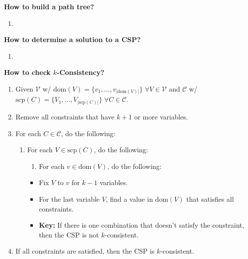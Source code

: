 \begin{example}
\end{example}

\begin{process} \textbf{How to build a path tree?}
    \begin{enumerate}
        \item 
    \end{enumerate}
\end{process}

\begin{example}
\end{example}

\begin{process} \textbf{How to determine a solution to a CSP?}
    \begin{enumerate}
        \item 
    \end{enumerate}
\end{process}

\begin{example}
\end{example}
\newpage

\begin{process} \textbf{How to check $k$-Consistency?} 
    \begin{enumerate}
        \item Given $\mathcal{V}$ w/ $\text{dom}(V) = \{v_1,\ldots,v_{|\text{dom}(V)|}\} \; \forall V \in \mathcal{V}$ and $\mathcal{C}$ w/ $\text{scp}(C) = \{V_1,\ldots,V_{|\text{scp}(C)|}\} \; \forall C \in \mathcal{C}$.
        \item Remove all constraints that have $k+1$ or more variables.
        \item For each $C \in \mathcal{C}$, do the following:
        \begin{enumerate}
            \item For each $V \in \text{scp}(C)$, do the following:
            \begin{enumerate}
                \item For each $v \in \text{dom}(V)$, do the following:
            \end{enumerate}
            \begin{itemize}
                \item Fix $V$ to $v$ for $k-1$ variables.
                \item For the last variable $V$, find a value in $\text{dom}(V)$ that satisfies all constraints.
                \item \textbf{Key:} If there is one combination that doesn't satisfy the constraint, then the CSP is not $k$-consistent.
            \end{itemize}
        \end{enumerate}
        \item If all constraints are satisfied, then the CSP is $k$-consistent.
    \end{enumerate}
\end{process}

